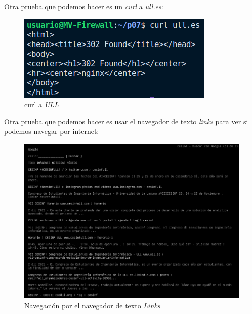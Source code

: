 \documentclass{report}
\begin{document}
  \cleardoublepage

  Otra prueba que podemos hacer es un \emph{curl} a \emph{ull.es}:

  \begin{figure}[H]
    \centering
    \includegraphics[scale=0.8]{img/curl_ull.png}
    \caption{curl a \emph{ULL}}
    \label{fig:curl ULL}
  \end{figure}

  Otra prueba que podemos hacer es usar el navegador de texto \emph{links} para ver si podemos navegar por internet:
  \begin{figure}[H]
    \centering
    \includegraphics[scale=0.65]{img/links_cesinf.png}
    \caption{Navegación por el navegador de texto \emph{Links}}
    \label{fig:links cesinf}
  \end{figure}
\end{document}
